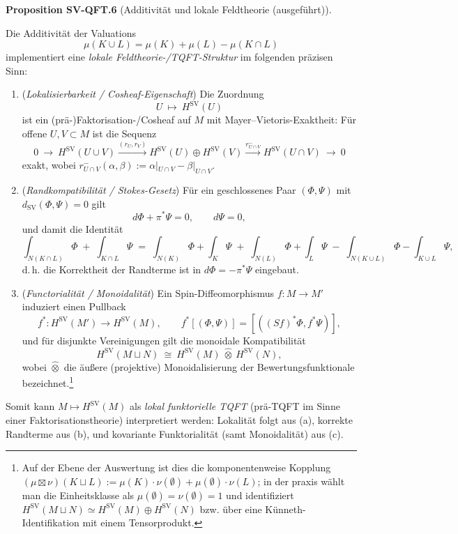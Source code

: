 \documentclass[10pt, letterpaper]{article}
\newcommand{\CustomHeading}[3]{%
  \par\medskip\noindent%
  \textbf{#1 #2} \textnormal{(#3)}.\enskip%
}
\newenvironment{PROP}[2]{\begin{unitbox}\CustomHeading{Proposition}{#1}{#2}}{\end{unitbox}}
\begin{document}
\begin{PROP}{SV-QFT.6}{Additivität und lokale Feldtheorie (ausgeführt)}
Die Additivität der Valuations
\[
\mu(K\cup L)=\mu(K)+\mu(L)-\mu(K\cap L)
\]
implementiert eine \emph{lokale Feldtheorie-/TQFT-Struktur} im folgenden präzisen Sinn:
\begin{enumerate}[label=\alph*)]
  \item (\emph{Lokalisierbarkeit / Cosheaf-Eigenschaft})
  Die Zuordnung
  \[
    U\ \longmapsto\ H^{\operatorname{SV}}(U)
  \]
  ist ein (prä-)Faktorisation-/Cosheaf auf $M$ mit Mayer--Vietoris-Exaktheit:
  Für offene $U,V\subset M$ ist die Sequenz
  \[
  0\ \longrightarrow\ H^{\operatorname{SV}}(U\cup V)\xrightarrow{(r_U,r_V)} H^{\operatorname{SV}}(U)\oplus H^{\operatorname{SV}}(V)
     \xrightarrow{r_{U\cap V}^-} H^{\operatorname{SV}}(U\cap V)\ \longrightarrow\ 0
  \]
  exakt, wobei $r_{U\cap V}^-(\alpha,\beta):=\alpha|_{U\cap V}-\beta|_{U\cap V}$.
  \item (\emph{Randkompatibilität / Stokes-Gesetz})
  Für ein geschlossenes Paar $(\Phi,\Psi)$ mit $d_{\operatorname{SV}}(\Phi,\Psi)=0$ gilt
  \[
    d\Phi+\pi^*\Psi=0,\qquad d\Psi=0,
  \]
  und damit die Identität
  \[
    \int_{N(K\cap L)}\!\!\!\!\Phi\;+\;\int_{K\cap L}\!\Psi
    \;=\;
    \int_{N(K)}\!\!\Phi+\int_{K}\!\Psi\;+\;\int_{N(L)}\!\!\Phi+\int_{L}\!\Psi\;-\;\int_{N(K\cup L)}\!\!\!\!\Phi-\int_{K\cup L}\!\Psi,
  \]
  d.\,h. die Korrektheit der Randterme ist in $d\Phi=-\pi^*\Psi$ eingebaut.
  \item (\emph{Functorialität / Monoidalität})
  Ein Spin-Diffeomorphismus $f:M\to M'$ induziert einen Pullback
  \[
  f^*:H^{\operatorname{SV}}(M')\longrightarrow H^{\operatorname{SV}}(M),\qquad f^*[(\Phi,\Psi)]=[((Sf)^*\Phi,f^*\Psi)],
  \]
  und für disjunkte Vereinigungen gilt die monoidale Kompatibilität
  \[
  H^{\operatorname{SV}}(M\sqcup N)\ \cong\ H^{\operatorname{SV}}(M)\ \widehat{\otimes}\ H^{\operatorname{SV}}(N),
  \]
  wobei $\widehat{\otimes}$ die äußere (projektive) Monoidalisierung der Bewertungsfunktionale bezeichnet.\footnote{Auf der Ebene der Auswertung ist dies die komponentenweise Kopplung 
  $(\mu\boxtimes\nu)(K\sqcup L):=\mu(K)\cdot\nu(\emptyset)+\mu(\emptyset)\cdot\nu(L)$; in der praxis wählt man die Einheitsklasse als $\mu(\emptyset)=\nu(\emptyset)=1$ und identifiziert $H^{\operatorname{SV}}(M\sqcup N)\simeq H^{\operatorname{SV}}(M)\oplus H^{\operatorname{SV}}(N)$ bzw. über eine Künneth-Identifikation mit einem Tensorprodukt.}
\end{enumerate}
Somit kann $M\mapsto H^{\operatorname{SV}}(M)$ als \emph{lokal funktorielle TQFT} (prä-TQFT im Sinne einer Faktorisationstheorie) interpretiert werden: Lokalität folgt aus (a), korrekte Randterme aus (b), und kovariante Funktorialität (samt Monoidalität) aus (c).
\end{PROP}
\end{document}
